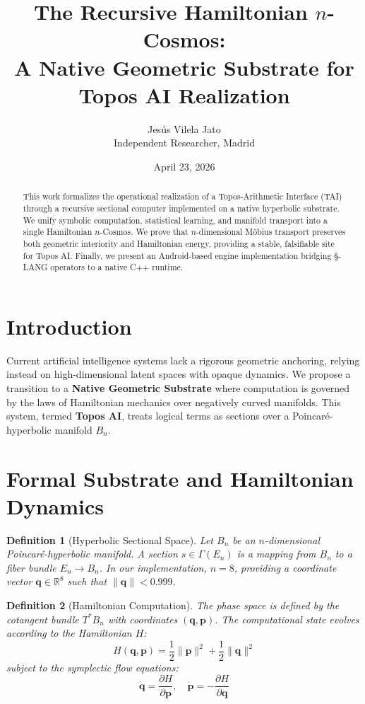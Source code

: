 \documentclass[12pt,a4paper]{article}
\title{The Recursive Hamiltonian $n$-Cosmos: \\ \large A Native Geometric Substrate for Topos AI Realization}
\author{Jesús Vilela Jato \\ \small Independent Researcher, Madrid}
\date{April 23, 2026}
\newtheorem{definition}{Definition}
\begin{document}
\maketitle

\begin{abstract}
This work formalizes the operational realization of a Topos-Arithmetic Interface (TAI) through a recursive sectional computer implemented on a native hyperbolic substrate. We unify symbolic computation, statistical learning, and manifold transport into a single Hamiltonian $n$-Cosmos. We prove that $n$-dimensional Möbius transport preserves both geometric interiority and Hamiltonian energy, providing a stable, falsifiable site for Topos AI. Finally, we present an Android-based engine implementation bridging §-LANG operators to a native C++ runtime.
\end{abstract}

\section{Introduction}
Current artificial intelligence systems lack a rigorous geometric anchoring, relying instead on high-dimensional latent spaces with opaque dynamics. We propose a transition to a \textbf{Native Geometric Substrate} where computation is governed by the laws of Hamiltonian mechanics over negatively curved manifolds. This system, termed \textbf{Topos AI}, treats logical terms as sections over a Poincaré-hyperbolic manifold $B_n$.

\section{Formal Substrate and Hamiltonian Dynamics}

\begin{definition}[Hyperbolic Sectional Space]
Let $B_n$ be an $n$-dimensional Poincaré-hyperbolic manifold. A section $s \in \Gamma(E_n)$ is a mapping from $B_n$ to a fiber bundle $E_n \to B_n$. In our implementation, $n=8$, providing a coordinate vector $\mathbf{q} \in \mathbb{R}^8$ such that $\|\mathbf{q}\| < 0.999$.
\end{definition}

\begin{definition}[Hamiltonian Computation]
The phase space is defined by the cotangent bundle $T^* B_n$ with coordinates $(\mathbf{q}, \mathbf{p})$. The computational state evolves according to the Hamiltonian $H$:
\begin{equation}
    H(\mathbf{q}, \mathbf{p}) = \frac{1}{2}\|\mathbf{p}\|^2 + \frac{1}{2}\|\mathbf{q}\|^2
\end{equation}
subject to the symplectic flow equations:
\begin{equation}
    \dot{\mathbf{q}} = \frac{\partial H}{\partial \mathbf{p}}, \quad \dot{\mathbf{p}} = -\frac{\partial H}{\partial \mathbf{q}}
\end{equation}
\end{definition}
\end{document}
